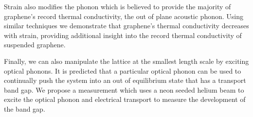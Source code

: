 Strain also modifies the phonon which is believed to provide the majority of graphene's record thermal conductivity, the out of plane acoustic phonon.
Using similar techniques we demonstrate that graphene's thermal conductivity decreases with strain, providing additional insight into the record thermal conductivity of suspended graphene.

Finally, we can also manipulate the lattice at the smallest length scale by exciting optical phonons.
It is predicted that a particular optical phonon can be used to continually push the system into an out of equilibrium state that has a transport band gap.
We propose a measurement which uses a neon seeded helium beam to excite the optical phonon and electrical transport to measure the development of the band gap.

\newpage